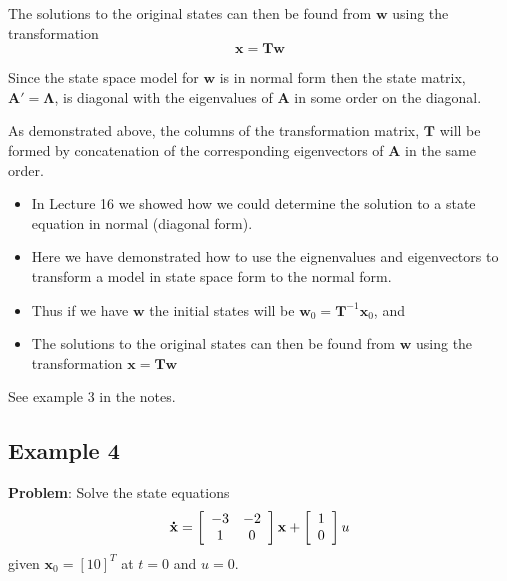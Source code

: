 The solutions to the original states can then be found from $\mathbf{w}$ using the transformation
\[
\mathbf{x}=\mathbf{Tw}
\]

Since the state space model for $\mathbf{w}$ is in normal form then the state matrix, $\mathbf{A}' = \mathbf{\Lambda}$, is diagonal with the eigenvalues of $\mathbf{A}$ in some order on the diagonal. 

As demonstrated above, the columns of the transformation matrix,  $\mathbf{T}$  will be formed by concatenation of the corresponding eigenvectors of $\mathbf{A}$ in the same order.
\ifslidesonly
\begin{slide}
   \begin{itemize}
   	\item In Lecture 16 we showed how we could determine the solution to a state equation in normal (diagonal form).
   	\item Here we have demonstrated how to use the eignenvalues and eigenvectors to transform a model in state space form to the normal form.
   	\item Thus if we have $\mathbf{w}$ the initial states will be $\mathbf{w}_0=\mathbf{T}^{-1}\mathbf{x}_0$, and
   	\item The solutions to the original states can then be found from $\mathbf{w}$ using the transformation $\mathbf{x}=\mathbf{Tw}$
\end{itemize}
See example 3 in the notes.
\end{slide}
\fi

\subsection*{Example 4} %
\label{sub:example_3}
\textbf{Problem}: Solve the state equations
\[
{\bf{\dot x}} = \left[ {\begin{array}{*{20}c}
   { - 3} & { - 2}  \\
   1 & 0  \\
\end{array}} \right]{\bf{x}} + \left[ {\begin{array}{*{20}c}
   1  \\
   0  \\
\end{array}} \right]u
\]
given $\mathbf{x}_0 = [1 0]^T$ at $t=0$  and  $u=0$.

